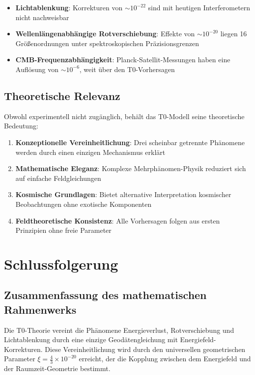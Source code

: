 \documentclass[12pt,a4paper]{article}
\theoremstyle{definition}
\begin{document}
	\begin{itemize}
		\item \textbf{Lichtablenkung}: Korrekturen von $\sim 10^{-22}$ sind mit heutigen Interferometern nicht nachweisbar
		\item \textbf{Wellenlängenabhängige Rotverschiebung}: Effekte von $\sim 10^{-20}$ liegen 16 Größenordnungen unter spektroskopischen Präzisionsgrenzen
		\item \textbf{CMB-Frequenzabhängigkeit}: Planck-Satellit-Messungen haben eine Auflösung von $\sim 10^{-6}$, weit über den T0-Vorhersagen
	\end{itemize}
	
	\subsection{Theoretische Relevanz}
	
	Obwohl experimentell nicht zugänglich, behält das T0-Modell seine theoretische Bedeutung:
	
	\begin{enumerate}
		\item \textbf{Konzeptionelle Vereinheitlichung}: Drei scheinbar getrennte Phänomene werden durch einen einzigen Mechanismus erklärt
		\item \textbf{Mathematische Eleganz}: Komplexe Mehrphänomen-Physik reduziert sich auf einfache Feldgleichungen
		\item \textbf{Kosmische Grundlagen}: Bietet alternative Interpretation kosmischer Beobachtungen ohne exotische Komponenten
		\item \textbf{Feldtheoretische Konsistenz}: Alle Vorhersagen folgen aus ersten Prinzipien ohne freie Parameter
	\end{enumerate}
	
	\section{Schlussfolgerung}
	
	\subsection{Zusammenfassung des mathematischen Rahmenwerks}
	
	Die T0-Theorie vereint die Ph\"anomene Energieverlust, Rotverschiebung und Lichtablenkung durch eine einzige Geod\"atengleichung mit Energiefeld-Korrekturen. Diese Vereinheitlichung wird durch den universellen geometrischen Parameter $\xi = \frac{4}{3} \times 10^{-20}$ erreicht, der die Kopplung zwischen dem Energiefeld und der Raumzeit-Geometrie bestimmt.
	
\end{document}
